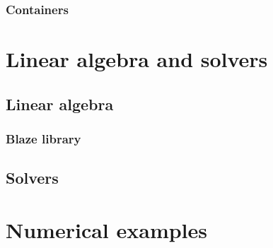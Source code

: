 \documentclass[11pt,fleqn]{book} %
\begin{document}
\section{Containers}


\theendnotes


\part{Linear algebra and solvers}

\chapter{Linear algebra}

\section{Blaze library}

\chapter{Solvers}

\part{Numerical examples}

\end{document}
